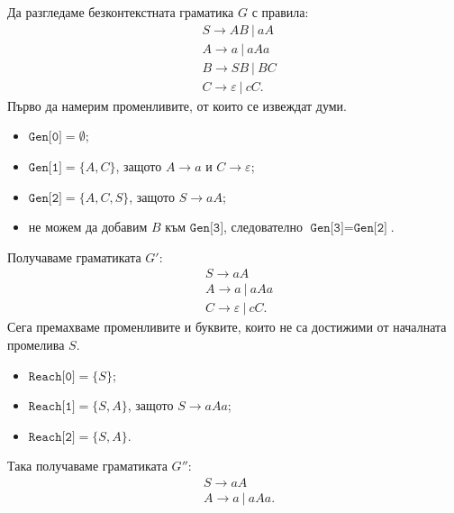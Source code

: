 \begin{extra2}
  \begin{example}
    Да разгледаме безконтекстната граматика $G$ с правила:
    \begin{align*}
      & S \to AB\ |\ aA\\
      & A \to a\ |\ aAa\\
      & B \to SB\ |\ BC\\
      & C \to \varepsilon\ |\ cC.
    \end{align*}
    Първо да намерим променливите, от които се извеждат думи.
    \begin{itemize}
    \item
      $\texttt{Gen[0]} = \emptyset$;
    \item 
      $\texttt{Gen[1]} = \{A, C\}$, защото $A \to a$ и $C \to \varepsilon$;
    \item
      $\texttt{Gen[2]} = \{A, C, S\}$, защото $S \to aA$;
    \item
      не можем да добавим $B$ към $\texttt{Gen[3]}$, следователно $\texttt{Gen[3]} = \texttt{Gen[2]}$.
    \end{itemize}
    Получаваме граматиката $G'$:
    \begin{align*}
      & S \to aA\\
      & A \to a\ |\ aAa\\
      & C \to \varepsilon\ |\ cC.
    \end{align*}
    Сега премахваме променливите и буквите, които не са достижими от началната промелива $S$.
    \begin{itemize}
    \item
      $\texttt{Reach[0]} = \{S\}$;
    \item
      $\texttt{Reach[1]} = \{S,A\}$, защото $S \to aAa$;
    \item
      $\texttt{Reach[2]} = \{S,A\}$.
    \end{itemize}
    Така получаваме граматиката $G''$:
    \begin{align*}
      & S \to aA\\
      & A \to a\ |\ aAa.
    \end{align*}
  \end{example}
\end{extra2}

